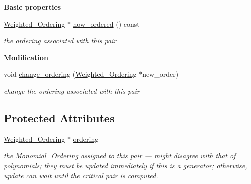 \begin{Indent}\textbf{ Basic properties}\par
\begin{DoxyCompactItemize}
\item 
\mbox{\label{class_critical___pair___dynamic_afbdf7f7bc0d9332c3df08858b0803aed}} 
\hyperlink{class_weighted___ordering}{Weighted\+\_\+\+Ordering} $\ast$ \hyperlink{class_critical___pair___dynamic_afbdf7f7bc0d9332c3df08858b0803aed}{how\+\_\+ordered} () const
\begin{DoxyCompactList}\small\item\em the ordering associated with this pair \end{DoxyCompactList}\end{DoxyCompactItemize}
\end{Indent}
\begin{Indent}\textbf{ Modification}\par
\begin{DoxyCompactItemize}
\item 
void \hyperlink{class_critical___pair___dynamic_aa9001ca49b2c2fd7d39384e4e70c5a6b}{change\+\_\+ordering} (\hyperlink{class_weighted___ordering}{Weighted\+\_\+\+Ordering} $\ast$new\+\_\+order)
\begin{DoxyCompactList}\small\item\em change the ordering associated with this pair \end{DoxyCompactList}\end{DoxyCompactItemize}
\end{Indent}
\subsection*{Protected Attributes}
\begin{DoxyCompactItemize}
\item 
\mbox{\label{class_critical___pair___dynamic_a29d3c615e66d3840c3aeb8ad9bc51647}} 
\hyperlink{class_weighted___ordering}{Weighted\+\_\+\+Ordering} $\ast$ \hyperlink{class_critical___pair___dynamic_a29d3c615e66d3840c3aeb8ad9bc51647}{ordering}
\begin{DoxyCompactList}\small\item\em the {\ttfamily \hyperlink{class_monomial___ordering}{Monomial\+\_\+\+Ordering}} assigned to this pair --- might disagree with that of polynomials; they must be updated immediately if this is a generator; otherwise, update can wait until the critical pair is computed. \end{DoxyCompactList}\end{DoxyCompactItemize}
